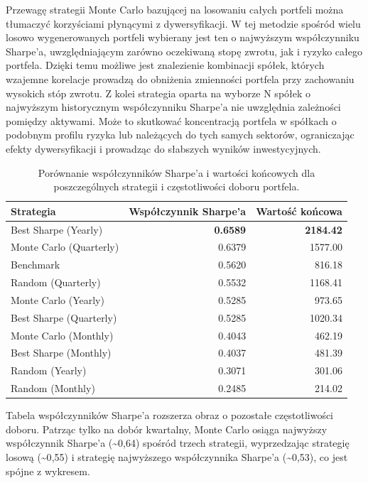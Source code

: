 \documentclass[12pt, a4paper]{article}
\begin{document}
Przewagę strategii Monte Carlo bazującej na losowaniu całych portfeli można tłumaczyć korzyściami płynącymi z dywersyfikacji. W tej metodzie spośród wielu losowo wygenerowanych portfeli wybierany jest ten o najwyższym współczynniku Sharpe'a, uwzględniającym zarówno oczekiwaną stopę zwrotu, jak i ryzyko całego portfela. Dzięki temu możliwe jest znalezienie kombinacji spółek, których wzajemne korelacje prowadzą do obniżenia zmienności portfela przy zachowaniu wysokich stóp zwrotu. Z kolei strategia oparta na wyborze N spółek o najwyższym historycznym współczynniku Sharpe'a nie uwzględnia zależności pomiędzy aktywami. Może to skutkować koncentracją portfela w spółkach o podobnym profilu ryzyka lub należących do tych samych sektorów, ograniczając efekty dywersyfikacji i prowadząc do słabszych wyników inwestycyjnych.

\begin{table}[H]
\centering
\caption{Porównanie współczynników Sharpe'a i wartości końcowych dla poszczególnych strategii i częstotliwości doboru portfela.}
\label{tab:sharpe_comparison}
\begin{tabular}{|l|r|r|}
\hline
\textbf{Strategia} & \textbf{Współczynnik Sharpe'a} & \textbf{Wartość końcowa} \\ \hline
Best Sharpe (Yearly) & \textbf{0.6589} & \textbf{2184.42} \\ \hline
Monte Carlo (Quarterly) & 0.6379 & 1577.00 \\ \hline
Benchmark & 0.5620 & 816.18 \\ \hline
Random (Quarterly) & 0.5532 & 1168.41 \\ \hline
Monte Carlo (Yearly) & 0.5285 & 973.65 \\ \hline
Best Sharpe (Quarterly) & 0.5285 & 1020.34 \\ \hline
Monte Carlo (Monthly) & 0.4043 & 462.19 \\ \hline
Best Sharpe (Monthly) & 0.4037 & 481.39 \\ \hline
Random (Yearly) & 0.3071 & 301.06 \\ \hline
Random (Monthly) & 0.2485 & 214.02 \\ \hline
\end{tabular}
\end{table}

Tabela współczynników Sharpe'a rozszerza obraz o pozostałe częstotliwości doboru. Patrząc tylko na dobór kwartalny, Monte Carlo osiąga najwyższy współczynnik Sharpe'a (\textasciitilde{}0{,}64) spośród trzech strategii, wyprzedzając strategię losową (\textasciitilde{}0{,}55) i strategię najwyższego współczynnika Sharpe'a (\textasciitilde{}0{,}53), co jest spójne z wykresem.
\end{document}

